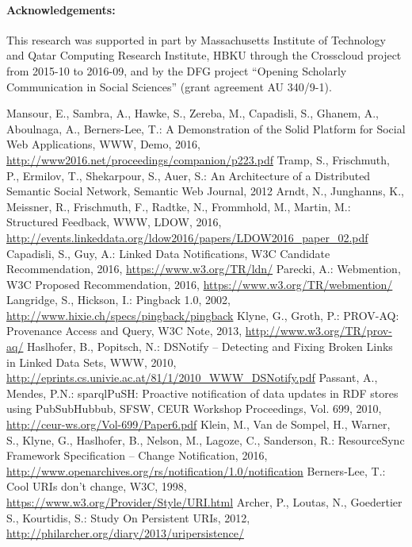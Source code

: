 \documentclass[a4paper]{llncs}
\begin{document}
\paragraph{Acknowledgements:}
This research was supported in part by Massachusetts Institute of Technology and Qatar Computing Research Institute, HBKU through the Crosscloud project from 2015-10 to 2016-09, and by the DFG project “Opening Scholarly Communication in Social Sciences” (grant agreement AU 340/9-1).

\begin{thebibliography}{99}
   Mansour, E., Sambra, A., Hawke, S., Zereba, M., Capadisli, S., Ghanem, A., Aboulnaga, A., Berners-Lee, T.: A Demonstration of the Solid Platform for Social Web Applications, WWW, Demo, 2016, \url{http://www2016.net/proceedings/companion/p223.pdf}
   Tramp, S., Frischmuth, P., Ermilov, T., Shekarpour, S., Auer, S.: An Architecture of a Distributed Semantic Social Network, Semantic Web Journal, 2012
   Arndt, N., Junghanns, K., Meissner, R., Frischmuth, F., Radtke, N., Frommhold, M., Martin, M.: Structured Feedback, WWW, LDOW, 2016, \url{http://events.linkeddata.org/ldow2016/papers/LDOW2016_paper_02.pdf}
   Capadisli, S., Guy, A.: Linked Data Notifications, W3C Candidate Recommendation, 2016, \url{https://www.w3.org/TR/ldn/}
   Parecki, A.: Webmention, W3C Proposed Recommendation, 2016,  \url{https://www.w3.org/TR/webmention/}
   Langridge, S., Hickson, I.: Pingback 1.0, 2002,  \url{http://www.hixie.ch/specs/pingback/pingback}
   Klyne, G., Groth, P.: PROV-AQ: Provenance Access and Query,  W3C Note, 2013, \url{http://www.w3.org/TR/prov-aq/}
   Haslhofer, B., Popitsch, N.: DSNotify – Detecting and Fixing Broken Links in Linked Data Sets, WWW, 2010, \url{http://eprints.cs.univie.ac.at/81/1/2010\_WWW\_DSNotify.pdf}
   Passant, A., Mendes, P.N.: sparqlPuSH: Proactive notification of data updates in RDF stores using PubSubHubbub, SFSW, CEUR Workshop Proceedings, Vol. 699, 2010, \url{http://ceur-ws.org/Vol-699/Paper6.pdf}
   Klein, M., Van de Sompel, H., Warner, S., Klyne, G., Haslhofer, B., Nelson, M., Lagoze, C., Sanderson, R.: ResourceSync Framework Specification – Change Notification, 2016,  \url{http://www.openarchives.org/rs/notification/1.0/notification}
   Berners-Lee, T.: Cool URIs don't change, W3C, 1998,  \url{https://www.w3.org/Provider/Style/URI.html}
   Archer, P., Loutas, N., Goedertier S., Kourtidis, S.: Study On Persistent URIs, 2012, \url{http://philarcher.org/diary/2013/uripersistence/}

\end{thebibliography}
\end{document}
